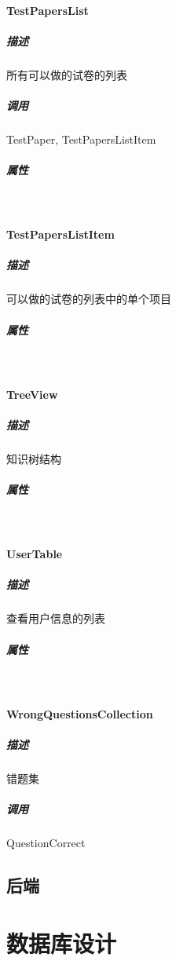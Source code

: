 \documentclass{article}
\begin{document}
        \paragraph{TestPapersList}
            \subparagraph{描述}
                所有可以做的试卷的列表
            \subparagraph{调用}
                TestPaper, TestPapersListItem
            \subparagraph{属性}\ \par
                
        \paragraph{TestPapersListItem}
            \subparagraph{描述}
                可以做的试卷的列表中的单个项目
            \subparagraph{属性}\ \par
            
        \paragraph{TreeView}
            \subparagraph{描述}
                知识树结构
            \subparagraph{属性}\ \par
                
        \paragraph{UserTable}
            \subparagraph{描述}
                查看用户信息的列表
            \subparagraph{属性}\ \par
                
        \paragraph{WrongQuestionsCollection}
            \subparagraph{描述}
                错题集
            \subparagraph{调用}
                QuestionCorrect

    \subsection{后端}
    
\section{数据库设计}
\end{document}
